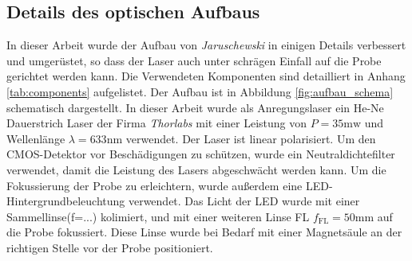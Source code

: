 \documentclass[titlepage]{article}
\begin{document}
\subsection{Details des optischen Aufbaus}
	In dieser Arbeit wurde der Aufbau von \textit{Jaruschewski} \cite{Jaruschewski.2020} in einigen Details verbessert und umgerüstet, so dass der Laser auch unter schrägen Einfall auf die Probe gerichtet werden kann. Die Verwendeten Komponenten sind detailliert in Anhang \ref{tab:components} aufgelistet. Der Aufbau ist in Abbildung \ref{fig:aufbau_schema} schematisch dargestellt. In dieser Arbeit wurde als Anregungslaser ein He-Ne Dauerstrich Laser der Firma \textit{Thorlabs} mit einer Leistung von $P = 35\mathrm{mw}$ und Wellenlänge $\lambda = 633\mathrm{nm}$ verwendet. Der Laser ist linear polarisiert. Um den CMOS-Detektor vor Beschädigungen zu schützen, wurde ein Neutraldichtefilter verwendet, damit die Leistung des Lasers abgeschwächt werden kann. Um die Fokussierung der Probe zu erleichtern, wurde außerdem eine LED-Hintergrundbeleuchtung verwendet. Das Licht der LED wurde mit einer Sammellinse(f=...) kolimiert, und mit einer weiteren Linse FL $f_{\mathrm{FL}}=50\mathrm{mm}$ auf die  Probe fokussiert. Diese Linse wurde bei Bedarf mit einer Magnetsäule an der richtigen Stelle vor der Probe positioniert.
\end{document}
